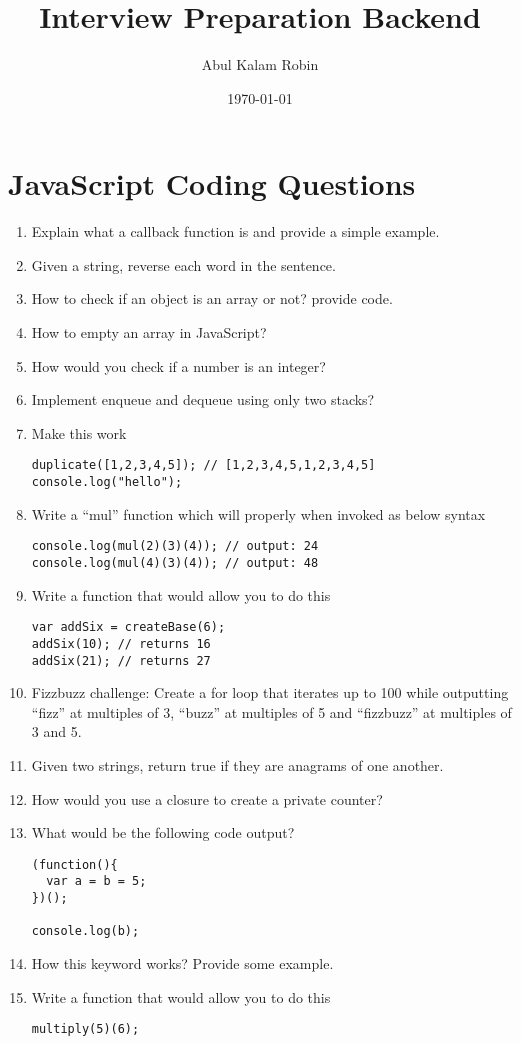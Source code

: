 \documentclass[11pt]{article}
\author{Abul Kalam Robin}
\date{\today}
\title{Interview Preparation Backend}
\begin{document}
\maketitle

\section*{JavaScript Coding Questions}
\label{sec:org99e51b5}
\begin{enumerate}
\item Explain what a callback function is and provide a simple example.
\item Given a string, reverse each word in the sentence.
\item How to check if an object is an array or not? provide code.
\item How to empty an array in JavaScript?
\item How would you check if a number is an integer?
\item Implement enqueue and dequeue using only two stacks?
\item Make this work
\begin{verbatim}
duplicate([1,2,3,4,5]); // [1,2,3,4,5,1,2,3,4,5]
console.log("hello");
\end{verbatim}

\item Write a ``mul'' function which will properly when invoked as below syntax
\begin{verbatim}
console.log(mul(2)(3)(4)); // output: 24
console.log(mul(4)(3)(4)); // output: 48
\end{verbatim}

\item Write a function that would allow you to do this
\begin{verbatim}
var addSix = createBase(6);
addSix(10); // returns 16
addSix(21); // returns 27
\end{verbatim}

\item Fizzbuzz challenge: Create a for loop that iterates up to 100 while outputting ``fizz'' at multiples of 3, ``buzz'' at multiples of 5 and ``fizzbuzz'' at multiples of 3 and 5.

\item Given two strings, return true if they are anagrams of one another.
\item How would you use a closure to create a private counter?
\item What would be the following code output?
\begin{verbatim}
(function(){
  var a = b = 5;
})();

console.log(b);
\end{verbatim}

\item How this keyword works? Provide some example.
\item Write a function that would allow you to do this
\begin{verbatim}
multiply(5)(6);
\end{verbatim}
\end{enumerate}
\end{document}
